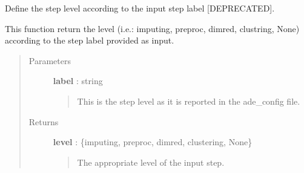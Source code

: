 \documentclass[letterpaper,10pt,english]{sphinxmanual}
\begin{document}
\begin{fulllineitems}
\label{index:adenine.core.pipelines.which_level}
Define the step level according to the input step label {[}DEPRECATED{]}.

This function return the level (i.e.: imputing, preproc, dimred, clustring,
None) according to the step label provided as input.
\begin{quote}\begin{description}
\item[{Parameters}] \leavevmode
\textbf{label} : string
\begin{quote}

This is the step level as it is reported in the ade\_config file.
\end{quote}

\item[{Returns}] \leavevmode
\textbf{level} : \{imputing, preproc, dimred, clustering, None\}
\begin{quote}

The appropriate level of the input step.
\end{quote}

\end{description}\end{quote}

\end{fulllineitems}

\end{document}
